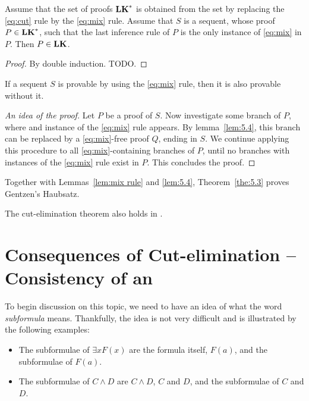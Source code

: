 \documentclass[11pt,a4paper]{article}
\begin{document}
\begin{lemma}[Lemma 5.4]\label{lem:5.4}
Assume that the set of proofs \(\textbf{LK}^\ast\) is obtained from
the set \LK{} by replacing the \eqref{eq:cut} rule by
the \eqref{eq:mix} rule. Assume that \(S\) is a sequent,
whose proof~\(P\in\textbf{LK}^\ast\), such that the last inference rule of \(P\)
is the only instance of \eqref{eq:mix} in \(P\).
Then \(P\in\textbf{LK}\).
\end{lemma}

\begin{proof}
    By double induction. TODO.
\end{proof}

\begin{theorem}[Theorem 5.3]\label{the:5.3}
    If a sequent \(S\) is provable by using the \eqref{eq:mix} rule,
    then it is also provable without it.
\end{theorem}

\begin{proof}[An idea of the proof]
    Let \(P\) be a proof of \(S\).
    Now investigate some branch of \(P\),
    where and instance of the \eqref{eq:mix} rule appears.
    By lemma~\ref{lem:5.4}, this branch can be replaced by
    a \eqref{eq:mix}-free proof \(Q\), ending in \(S\).
    We continue applying this procedure to all
    \eqref{eq:mix}-containing branches of \(P\),
    until no branches with instances of the \eqref{eq:mix} rule
    exist in \(P\). This concludes the proof.
\end{proof}

Together with Lemmas~\ref{lem:mix rule} and \ref{lem:5.4},
Theorem~\ref{the:5.3} proves Gentzen's Haubsatz.

\begin{theorem}[Theorem 5.5]\label{the:5.5}
    The cut-elimination theorem also holds in \LJ.
\end{theorem}

\section{Consequences of Cut-elimination -- Consistency of \LK{} an \LJ}

To begin discussion on this topic, we need to have an idea
of what the word \emph{subformula} means. Thankfully,
the idea is not very difficult and is illustrated by
the following examples:
\begin{itemize}
    \item
        The subformulae of \(\exists xF(x)\) are the formula itself,
        \(F(a)\), and the subformulae of \(F(a)\).
    \item
        The subformulae of \(C\land D\) are \(C\land D\), \(C\) and \(D\),
        and the subformulae of \(C\) and \(D\).
\end{itemize}
\end{document}
